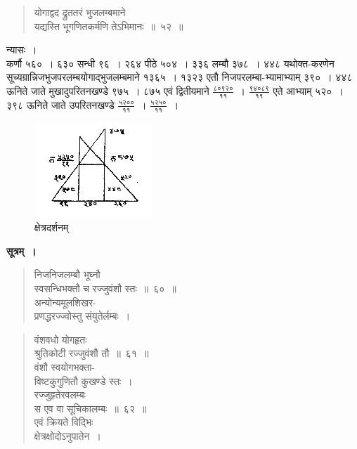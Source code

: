 \documentclass[11pt, openany]{book}
\begin{document}
\begin{quote}
    \bqt 
योगाद्वद द्रुततरं भुजलम्बमाने \\
यद्यस्ति भूगणितकर्मणि तेऽभिमानः~॥~५२~॥
\end{quote}

 न्यासः~। \\

\vspace{-4mm}
कर्णौ ५६०~। ६३० सन्धी ९६~। २६४ पीठे ५०४~। ३३६ लम्बौ ३७८~। ४४८ यथोक्त-करणेन सूच्यग्रान्निजभुजपरलम्बयोगाद्भुजलम्बमाने
१३६५~। १३२३ एतौ निजपरलम्बा-भ्यामाभ्याम् ३९०~। ४४८ ऊनिते जाते
मुखादुपरितनखण्डे ९७५~। ८७५ एवं द्वितीयमाने $\frac{\mbox{८०९२०}}{\mbox{११}}$~। $\frac{\mbox{९४०८९}}{\mbox{११}}$
एते आभ्याम् ५२०~। ३९८ ऊनिते जाते उपरितनखण्डे 
$\frac{\mbox{५२००}}{\mbox{११}}$~। 
$\frac{\mbox{५२५०}}{\mbox{११}}$~। 
\begin{figure}[h!]
    \centering
   \captionsetup{labelformat=empty}
  \caption{क्षेत्रदर्शनम्}
\vspace{-2mm}
    \includegraphics[scale=0.85]{graphics/capture66.png}
\end{figure}

 \textbf{सूत्रम्~।} 
 \begin{quote}
     \bs 
निजनिजलम्बौ भूघ्नौ \\
स्वसन्धिभक्तौ च रज्जुवंशौ स्तः~॥~६०~॥ \\
अन्योन्यमूलशिखर-\\
प्रणद्धरज्ज्वोस्तु संयुतेर्लम्बः~।
\end{quote}
\newpage

 \begin{quote}
     \bs 
वंशवधो योगहृतः \\
श्रुतिकोटी रज्जुवंशौ तौ~॥~६१~॥ \\
वंशौ स्वयोगभक्ता-\\
विष्टकुगुणितौ कुखण्डे स्तः~।\\
रज्जुहृतेरवलम्बः \\
स एव वा सूचिकालम्बः~॥~६२~॥\\
एवं क्रियते विद्भिः \\
क्षेत्रक्षोदोऽनुपातेन~।
\end{quote}
\end{document}
